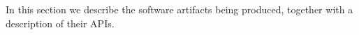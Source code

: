 In this section we describe the software artifacts being produced, together with a description of their APIs.


































